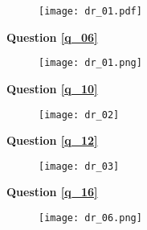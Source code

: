 \begin{figure}[H]
\centering
\texttt{[image: dr\_01.pdf]}
\end{figure}

\textbf{Question \ref{q_06}}
\begin{figure}[H]
\centering
\texttt{[image: dr\_01.png]}
\end{figure}


\newpage


\textbf{Question \ref{q_10}}
\begin{figure}[H]
\centering
\texttt{[image: dr\_02]}
\end{figure}


\textbf{Question \ref{q_12}}

\begin{figure}[H]
\centering
\texttt{[image: dr\_03]}
\end{figure}


\textbf{Question \ref{q_16}}

\begin{figure}[H]
\centering
{\texttt{[image: dr\_06.png]}}
\end{figure}


\newpage
%
%
%
%
%
%
%
%

\fi
